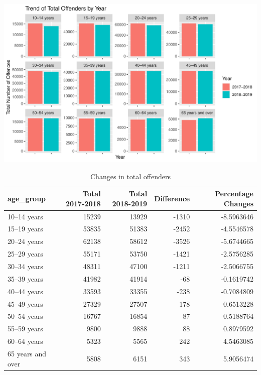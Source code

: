 \documentclass[11pt,a4paper,]{article}
\let\origfigure\figure
\let\endorigfigure\endfigure
\renewenvironment{figure}[1][2] {
\expandafter\origfigure\expandafter[H]
} {
\endorigfigure
}
\begin{document}
\begin{figure}
\centering
\includegraphics{ETC5513-Assignment4_files/figure-latex/age-yearly-changes-1.pdf}
\caption{\label{fig:age-yearly-changes}Distribution of total offenders yearly}
\end{figure}

\begin{table}[H]

\caption{\label{tab:summary-table}Changes in total offenders}
\centering
\begin{tabular}[t]{l|r|r|r|r}
\hline
age\_group & Total 2017-2018 & Total 2018-2019 & Difference & Percentage Changes\\
\hline
10–14 years & 15239 & 13929 & -1310 & -8.5963646\\
\hline
15–19 years & 53835 & 51383 & -2452 & -4.5546578\\
\hline
20–24 years & 62138 & 58612 & -3526 & -5.6744665\\
\hline
25–29 years & 55171 & 53750 & -1421 & -2.5756285\\
\hline
30–34 years & 48311 & 47100 & -1211 & -2.5066755\\
\hline
35–39 years & 41982 & 41914 & -68 & -0.1619742\\
\hline
40–44 years & 33593 & 33355 & -238 & -0.7084809\\
\hline
45–49 years & 27329 & 27507 & 178 & 0.6513228\\
\hline
50–54 years & 16767 & 16854 & 87 & 0.5188764\\
\hline
55–59 years & 9800 & 9888 & 88 & 0.8979592\\
\hline
60–64 years & 5323 & 5565 & 242 & 4.5463085\\
\hline
65 years and over & 5808 & 6151 & 343 & 5.9056474\\
\hline
\end{tabular}
\end{table}
\end{document}
